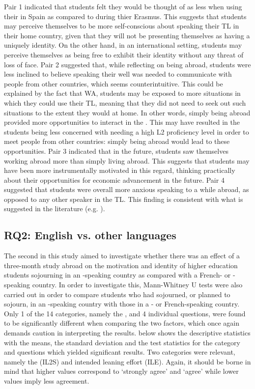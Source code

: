 \documentclass[output=paper]{langsci/langscibook}
\begin{document}
Pair 1 indicated that students felt they would be thought of as less  when using their  in Spain as compared to during thier Erasmus. This suggests that students may perceive themselves to be more self-conscious about speaking their TL in their home country, given that they will not be presenting themselves as having a uniquely  identity. On the other hand, in an international setting, students may perceive themselves as being free to exhibit their  identity without any threat of loss of face. Pair 2 suggested that, while reflecting on being abroad, students were less inclined to believe speaking their  well was needed to communicate with people from other countries, which seems counterintuitive. This could be explained by the fact that WA, students may be exposed to more situations in which they could use their TL, meaning that they did not need to seek out such situations to the extent they would at home. In other words, simply being abroad provided more opportunities to interact in the . This may have resulted in the students being less concerned with needing a high L2 proficiency level in order to meet people from other countries: simply being abroad would lead to these opportunities. Pair 3 indicated that in the future, students saw themselves working abroad more than simply living abroad. This suggests that students may have been more instrumentally motivated in this regard, thinking practically about their opportunities for economic advancement in the future. Pair 4 suggested that students were overall more anxious speaking to a  while abroad, as opposed to any other speaker in the TL. This finding is consistent with what is suggested in the literature (e.g. \citealt{Woodrow2006}).

 
\subsection{RQ2: English vs. other languages}


The second  in this study aimed to investigate whether there was an effect of a three-month study abroad on the motivation and identity of higher education students sojourning in an -speaking country as compared with a French- or -speaking country. In order to investigate this, Mann-Whitney U tests were also carried out in order to compare students who had sojourned, or planned to sojourn, in an -speaking country with those in a - or French-speaking country. Only 1 of the 14 categories, namely the , and 4 individual questions, were found to be significantly different when comparing the two factors, which once again demands caution in interpreting the results.  below shows the descriptive statistics with the means, the standard deviation and the test statistics for the category and questions which yielded significant results. Two categories were relevant, namely the  (IL2S) and intended leaning effort (ILE). Again, it should be borne in mind that higher values correspond to ‘strongly agree’ and ‘agree’ while lower values imply less agreement.
\end{document}
